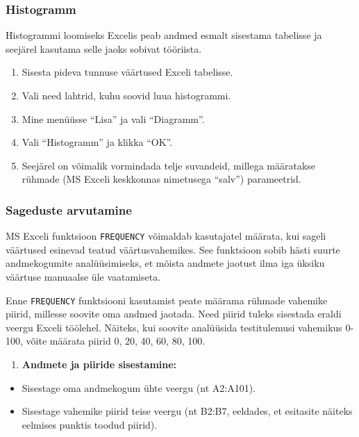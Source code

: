 \documentclass[
]{book}
\providecommand{\tightlist}{%
  \setlength{\itemsep}{0pt}\setlength{\parskip}{0pt}}
\begin{document}
\subsubsection{Histogramm}\label{histogramm-2}

Histogrammi loomiseks Excelis peab andmed esmalt sisestama tabelisse ja seejärel kasutama selle jaoks sobivat tööriista.

\begin{enumerate}
\def\labelenumi{\arabic{enumi}.}
\tightlist
\item
  Sisesta pideva tunnuse väärtused Exceli tabelisse.
\item
  Vali need lahtrid, kuhu soovid luua histogrammi.
\item
  Mine menüüsse ``Lisa'' ja vali ``Diagramm''.
\item
  Vali ``Histogramm'' ja klikka ``OK''.
\item
  Seejärel on võimalik vormindada telje suvandeid, millega määratakse rühmade (MS Exceli keskkonnas nimetusega ``salv'') parameetrid.
\end{enumerate}

\subsubsection{Sageduste arvutamine}\label{sageduste-arvutamine-1}

MS Exceli funktsioon \texttt{FREQUENCY} võimaldab kasutajatel määrata, kui sageli väärtused esinevad teatud väärtusvahemikes. See funktsioon sobib hästi suurte andmekogumite analüüsimiseks, et mõista andmete jaotust ilma iga üksiku väärtuse manuaalse üle vaatamiseta.

Enne \texttt{FREQUENCY} funktsiooni kasutamist peate määrama rühmade vahemike piirid, millesse soovite oma andmed jaotada. Need piirid tuleks sisestada eraldi veergu Exceli töölehel. Näiteks, kui soovite analüüsida testitulemusi vahemikus 0-100, võite määrata piirid 0, 20, 40, 60, 80, 100.

\begin{enumerate}
\def\labelenumi{\arabic{enumi}.}
\tightlist
\item
  \textbf{Andmete ja piiride sisestamine:}
\end{enumerate}

\begin{itemize}
\tightlist
\item
  Sisestage oma andmekogum ühte veergu (nt A2:A101).
\item
  Sisestage vahemike piirid teise veergu (nt B2:B7, eeldades, et esitasite näiteks eelmises punktis toodud piirid).
\end{itemize}
\end{document}
